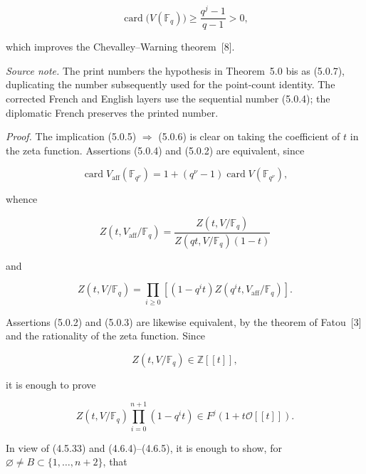 \begin{equation}\tag{5.0.6 bis}
\operatorname{card}\bigl(V(\mathbb F_q)\bigr)
\geq\frac{q^j-1}{q-1}>0,
\end{equation}

\noindent
which improves the Chevalley--Warning theorem~[8].

\medskip
\noindent\emph{Source note.}
The print numbers the hypothesis in Theorem~5.0 bis as (5.0.7), duplicating
the number subsequently used for the point-count identity.  The corrected
French and English layers use the sequential number (5.0.4); the diplomatic
French preserves the printed number.

\medskip
\noindent\emph{Proof.}
The implication (5.0.5) $\Rightarrow$ (5.0.6) is clear on taking the
coefficient of $t$ in the zeta function.  Assertions (5.0.4) and (5.0.2)
are equivalent, since

\begin{equation}\tag{5.0.7}
\operatorname{card}V_{\mathrm{aff}}(\mathbb F_{q^\nu})
=1+(q^\nu-1)\operatorname{card}V(\mathbb F_{q^\nu}),
\end{equation}

whence

\begin{equation}\tag{5.0.8}
Z(t,V_{\mathrm{aff}}/\mathbb F_q)
=\frac{Z(t,V/\mathbb F_q)}
{Z(qt,V/\mathbb F_q)(1-t)}
\end{equation}

and

\begin{equation}\tag{5.0.9}
Z(t,V/\mathbb F_q)
=\prod_{i\geq0}
\left[(1-q^it)Z(q^it,V_{\mathrm{aff}}/\mathbb F_q)\right].
\end{equation}

\noindent
Assertions (5.0.2) and (5.0.3) are likewise equivalent, by the theorem of
Fatou~[3] and the rationality of the zeta function.  Since

\begin{equation}\tag{5.0.10}
Z(t,V/\mathbb F_q)\in\mathbb Z[[t]],
\end{equation}

it is enough to prove

\begin{equation}\tag{5.0.11}
Z(t,V/\mathbb F_q)\prod_{i=0}^{n+1}(1-q^it)
\in F^j(1+t\mathcal O[[t]]).
\end{equation}

In view of (4.5.33) and (4.6.4)--(4.6.5), it is enough to show, for
$\varnothing\ne B\subset\{1,\ldots,n+2\}$, that

